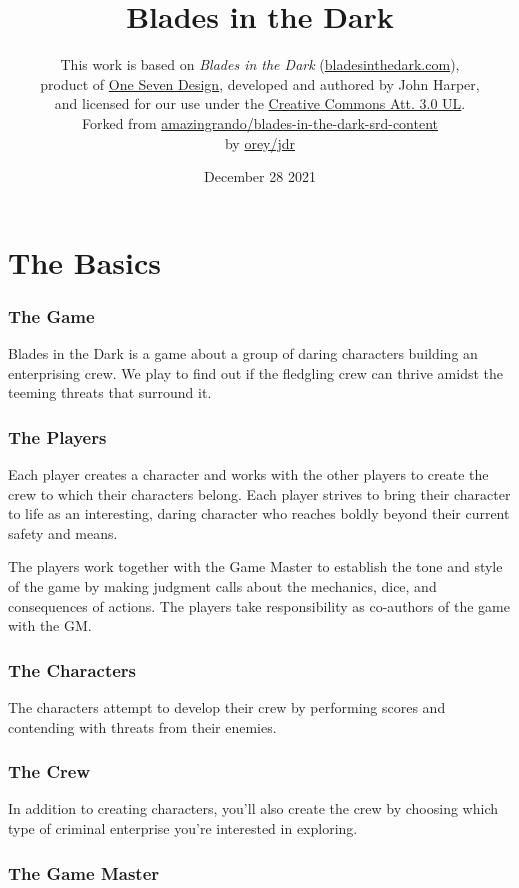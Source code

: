 \documentclass[11pt,oneside]{book}
\title{Blades in the Dark}
\date{December 28 2021}
\author{This work is based on \textit{Blades in the Dark} (\href{http://www.bladesinthedark.com}{bladesinthedark.com}), \\
product of \href{http://www.onesevendesign.com}{One Seven Design}, developed and authored by John Harper, \\
and licensed for our use under the \href{http://creativecommons.org/licenses/by/3.0/}{Creative Commons Att. 3.0 UL}. \\
Forked from \href{https://github.com/amazingrando/blades-in-the-dark-srd-content}{amazingrando/blades-in-the-dark-srd-content}\\
by \href{https://github.com/orey/jdr}{orey/jdr}}
\begin{document}
\maketitle

\tableofcontents

\part{The Basics}

\section{The Game}

Blades in the Dark is a game about a group of daring characters building an enterprising crew. We play to find out if the fledgling crew can thrive amidst the teeming threats that surround it.

\section{The Players}

Each player creates a character and works with the other players to create the crew to which their characters belong. Each player strives to bring their character to life as an interesting, daring character who reaches boldly beyond their current safety and means.

The players work together with the Game Master to establish the tone and style of the game by making judgment calls about the mechanics, dice, and consequences of actions. The players take responsibility as co-authors of the game with the GM.

\section{The Characters}

The characters attempt to develop their crew by performing scores and contending with threats from their enemies.

\section{The Crew}

In addition to creating characters, you’ll also create the crew by choosing which type of criminal enterprise you’re interested in exploring.

\section{The Game Master}
\end{document}

